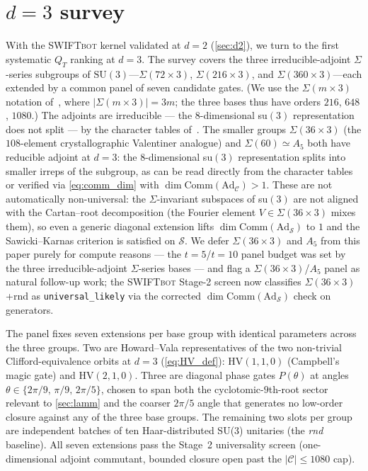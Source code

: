 \documentclass[twocolumn,superscriptaddress,showpacs,nofootinbib,notitlepage,preprintnumbers,secnumarabic,amssymb, nobibnotes, aps, prd]{revtex4-2}
\newcommand{\QT}{Q_{T}}              %
\newcommand{\HV}[3]{\mathrm{HV}(#1,#2,#3)} %
\newcommand{\Sigmathree}[1]{\Sigma(#1\!\times\!3)} %
\newcommand{\SWIFTbot}{\textsc{SWIFTbot}\xspace}
\begin{document}
\section{$d=3$ survey}\label{sec:d3}

With the \SWIFTbot kernel validated at $d=2$ (\cref{sec:d2}), we turn to the first systematic $\QT$ ranking at $d=3$. The survey covers the three irreducible-adjoint $\Sigma$-series subgroups of $\mathrm{SU}(3)$---$\Sigmathree{72}$, $\Sigmathree{216}$, and $\Sigmathree{360}$---each extended by a common panel of seven candidate gates. (We use the $\Sigma(m\!\times\!3)$ notation of~\cite{Fairbairn:1964,GrimusLudl:2010}, where $|\Sigma(m\!\times\!3)| = 3m$; the three bases thus have orders $216$, $648$, $1080$.) The adjoints are irreducible --- the $8$-dimensional su$(3)$ representation does not split --- by the character tables of~\cite{GrimusLudl:2010}. The smaller groups $\Sigmathree{36}$ (the $108$-element crystallographic Valentiner analogue) and $\Sigma(60)\simeq A_5$ both have reducible adjoint at $d=3$: the $8$-dimensional su$(3)$ representation splits into smaller irreps of the subgroup, as can be read directly from the character tables~\cite{GrimusLudl:2010} or verified via \cref{eq:comm_dim} with $\dim\mathrm{Comm}(\mathrm{Ad}_\mathcal{C})>1$. These are not automatically non-universal: the $\Sigma$-invariant subspaces of su$(3)$ are not aligned with the Cartan--root decomposition (the Fourier element $V \in \Sigmathree{36}$ mixes them), so even a generic diagonal extension lifts $\dim\mathrm{Comm}(\mathrm{Ad}_\mathcal{S})$ to $1$ and the Sawicki--Karnas criterion is satisfied on $\mathcal{S}$. We defer $\Sigmathree{36}$ and $A_5$ from this paper purely for compute reasons --- the $t=5$/$t=10$ panel budget was set by the three irreducible-adjoint $\Sigma$-series bases --- and flag a $\Sigmathree{36}$/$A_5$ panel as natural follow-up work; the \SWIFTbot Stage-2 screen now classifies $\Sigmathree{36}$+rnd as \texttt{universal\_likely} via the corrected $\dim\mathrm{Comm}(\mathrm{Ad}_\mathcal{S})$ check on generators.

The panel fixes seven extensions per base group with identical parameters across the three groups. Two are Howard--Vala representatives of the two non-trivial Clifford-equivalence orbits at $d=3$ (\cref{eq:HV_def}): $\HV{1}{1}{0}$ (Campbell's magic gate) and $\HV{2}{1}{0}$. Three are diagonal phase gates $P(\theta)$ at angles $\theta \in \{2\pi/9,\,\pi/9,\,2\pi/5\}$, chosen to span both the cyclotomic-$9$th-root sector relevant to \cref{sec:lamm} and the coarser $2\pi/5$ angle that generates no low-order closure against any of the three base groups. The remaining two slots per group are independent batches of ten Haar-distributed SU(3) unitaries (the \emph{rnd} baseline). All seven extensions pass the Stage~2 universality screen (one-dimensional adjoint commutant, bounded closure open past the $|\mathcal{C}|\leq 1080$ cap).
\end{document}

